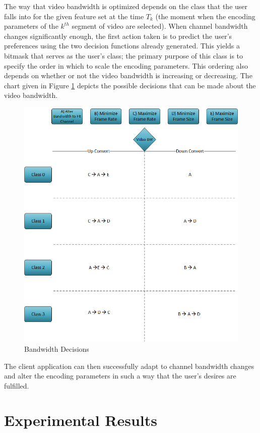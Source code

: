 \documentclass[3p,times,procedia]{elsarticle}
\begin{document}
The way that video bandwidth is optimized depends on the class that the user falls into for the given feature set at the time $T_k$ (the moment when the encoding parameters of the $k^{th}$ segment of video are selected). When channel bandwidth changes significantly enough, the first action taken is to predict the user’s preferences using the two decision functions already generated. This yields a bitmask that serves as the user’s class; the primary purpose of this class is to specify the order in which to scale the encoding parameters. This ordering also depends on whether or not the video bandwidth is increasing or decreasing. The chart given in Figure \ref{fig:ScalingDecisionChart} depicts the possible decisions that can be made about the video bandwidth.
\begin{figure}[H]
\centering
\includegraphics[width=0.65\linewidth]{BandwidthDecisions.png}
\caption{Bandwidth Decisions}
\label{fig:ScalingDecisionChart}
\end{figure}
The client application can then successfully adapt to channel bandwidth changes and alter the encoding parameters in such a way that the user’s desires are fulfilled.

\section{Experimental Results}
\label{sec:Results}
\end{document}
